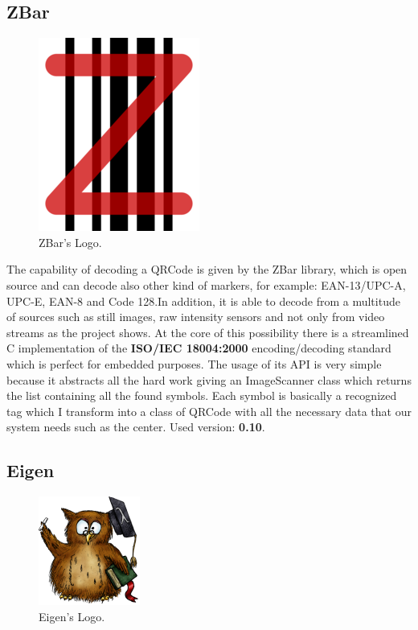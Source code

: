 \subsection{ZBar}
\begin{figure}[hbt]
    \centering
    \includegraphics[scale=0.5]{img/zbar.png}
    \caption{ZBar's Logo.}
\end{figure}
The capability of decoding a QRCode is given by the ZBar library, which is open source and can decode also other kind of markers, for example: EAN-13/UPC-A, UPC-E, EAN-8 and Code 128.In addition, it is able to decode from a multitude of sources such as still images, raw intensity sensors and not only from video streams as the project shows. At the core of this possibility there is a streamlined C implementation of the \textbf{ISO/IEC 18004:2000} encoding/decoding standard which is perfect for embedded purposes.
The usage of its API is very simple because it abstracts all the hard work giving an ImageScanner class which returns the list containing all the found symbols. Each symbol is basically a recognized tag which I transform into a class of QRCode with all the necessary data that our system needs such as the center.
\newline Used version: \textbf{0.10}.

\subsection{Eigen}

\begin{figure}[hbt]
    \centering
    \includegraphics[scale=0.5]{img/eigen.png}
    \caption{Eigen's Logo.}
\end{figure}

